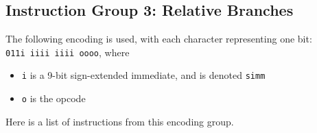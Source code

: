 \documentclass{article}
\begin{document}
	\doublespacing
	\subsection{Instruction Group 3: Relative Branches}
	The following encoding is used, with each character representing one
	bit: \\
	\texttt{011i iiii iiii oooo}, where

	\singlespacing
	\begin{itemize}
	\item \texttt{i} is a 9-bit sign-extended immediate, and is denoted
	\texttt{simm}
	\item \texttt{o} is the opcode
	\end{itemize}
	\doublespacing

	Here is a list of instructions from this encoding group.
\end{document}
